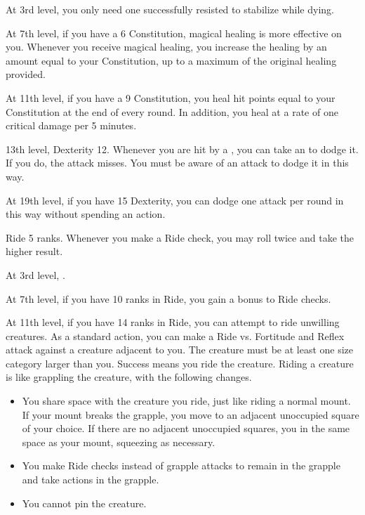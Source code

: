     At 3rd level, you only need one successfully resisted  to stabilize while dying.

    At 7th level, if you have a 6 Constitution, magical healing is more effective on you.
    Whenever you receive magical healing, you increase the healing by an amount equal to your Constitution, up to a maximum of the original healing provided.

    At 11th level, if you have a 9 Constitution, you heal hit points equal to your Constitution at the end of every round.
    In addition, you heal  at a rate of one critical damage per 5 minutes.

    \featpres 13th level, Dexterity 12.
    \featben Whenever you are hit by a , you can take an  to dodge it.
    If you do, the attack misses.
    You must be aware of an attack to dodge it in this way.

    At 19th level, if you have 15 Dexterity, you can dodge one attack per round in this way without spending an action.

    \featpre Ride 5 ranks.
    \featben Whenever you make a Ride check, you may roll twice and take the higher result.

    At 3rd level, \tdash.

    At 7th level, if you have 10 ranks in Ride, you gain a  bonus to Ride checks.

    At 11th level, if you have 14 ranks in Ride, you can attempt to ride unwilling creatures.
    As a standard action, you can make a Ride vs. Fortitude and Reflex attack against a creature adjacent to you.
    The creature must be at least one size category larger than you.
    Success means you ride the creature.
    Riding a creature is like grappling the creature, with the following changes.
    \begin{itemize}
        \item You share space with the creature you ride, just like riding a normal mount.
            If your mount breaks the grapple, you move to an adjacent unoccupied square of your choice.
            If there are no adjacent unoccupied squares, you in the same space as your mount, squeezing as necessary.
        \item You make Ride checks instead of grapple attacks to remain in the grapple and take actions in the grapple.
        \item You cannot pin the creature.
    \end{itemize}

